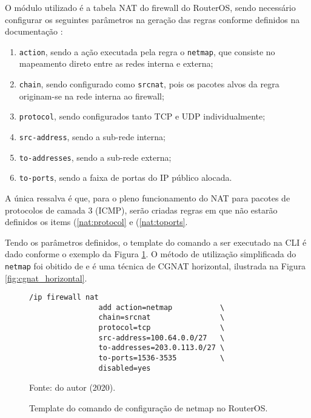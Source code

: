     O módulo utilizado é a tabela NAT do firewall do RouterOS, sendo necessário configurar os seguintes parâmetros na geração das regras conforme definidos na documentação \cite{natmikrotik}:

    \begin{enumerate}[label=\alph*)]
        \item \label{nat:action} {\tt action}, sendo a ação executada pela regra o {\tt netmap}, que consiste no mapeamento direto entre as redes interna e externa;
        
        \item \label{nat:chain} {\tt chain}, sendo configurado como {\tt srcnat}, pois os pacotes alvos da regra originam-se na rede interna ao firewall; 
        
        \item \label{nat:protocol} {\tt protocol}, sendo configurados tanto TCP e UDP individualmente; 
        
        \item \label{nat:srcaddress} {\tt src-address}, sendo a sub-rede interna;
        
        \item \label{nat:toaddress} {\tt to-addresses}, sendo a sub-rede externa;
        
        \item \label{nat:toports} {\tt to-ports}, sendo a faixa de portas do IP público alocada.
    \end{enumerate}

    A única ressalva é que, para o pleno funcionamento do NAT para pacotes de protocolos de camada 3 (ICMP), serão criadas regras em que não estarão definidos os items (\ref{nat:protocol} e (\ref{nat:toports}.

    Tendo os parâmetros definidos, o template do comando a ser executado na CLI é dado conforme o exemplo da Figura \ref{fig:netmap_cli}. O método de utilização simplificada do {\tt netmap} foi obitido de \cite{maia2018} e é uma técnica de CGNAT horizontal, ilustrada na Figura \ref{fig:cgnat_horizontal}.

    \begin{figure}[!htb]
        \centering
        \caption{Template do comando de configuração de netmap no RouterOS.} 
        \label{fig:netmap_cli}
        
        \begin{Verbatim}[fontsize=\small]
            /ip firewall nat 
                add action=netmap           \
                chain=srcnat                \
                protocol=tcp                \
                src-address=100.64.0.0/27   \
                to-addresses=203.0.113.0/27 \
                to-ports=1536-3535          \
                disabled=yes
        \end{Verbatim} 

        {\small Fonte: do autor (2020).} 
    \end{figure}

